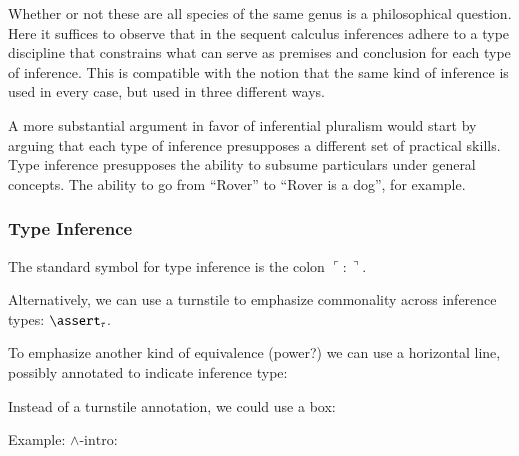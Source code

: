\documentclass{article}
\begin{document}
Whether or not these are all species of the same genus is a
philosophical question. Here it suffices to observe that in the
sequent calculus inferences adhere to a type discipline that
constrains what can serve as premises and conclusion for each type of
inference. This is compatible with the notion that the same kind of
inference is used in every case, but used in three different ways.

A more substantial argument in favor of inferential pluralism would
start by arguing that each type of inference presupposes a different
set of practical skills. Type inference presupposes the ability to
subsume particulars under general concepts. The ability to go from
``Rover'' to ``Rover is a dog'', for example.

\subsubsection{Type Inference}

The standard symbol for type inference is the colon \(\ulcorner :\urcorner\).

Alternatively, we can use a turnstile to emphasize commonality across inference types: \(\linfer_{\tau}\).

To emphasize another kind of equivalence (power?) we can use a horizontal line, possibly annotated to indicate inference type:

Instead of a turnstile annotation, we could use a box:

Example: \(\land\text{-intro}\):



\end{document}

